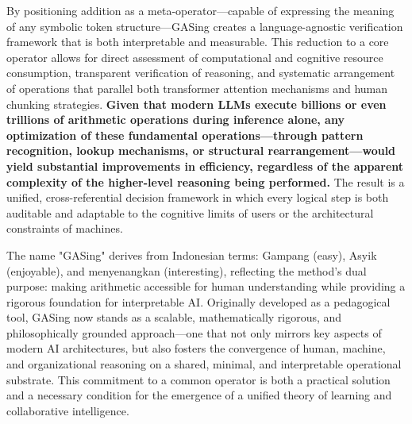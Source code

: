 By positioning addition as a meta-operator—capable of expressing the meaning of any symbolic token structure—GASing creates a language-agnostic verification framework that is both interpretable and measurable. This reduction to a core operator allows for direct assessment of computational and cognitive resource consumption, transparent verification of reasoning, and systematic arrangement of operations that parallel both transformer attention mechanisms and human chunking strategies. \textbf{Given that modern LLMs execute billions or even trillions of arithmetic operations during inference alone, any optimization of these fundamental operations—through pattern recognition, lookup mechanisms, or structural rearrangement—would yield substantial improvements in efficiency, regardless of the apparent complexity of the higher-level reasoning being performed.} The result is a unified, cross-referential decision framework in which every logical step is both auditable and adaptable to the cognitive limits of users or the architectural constraints of machines.

The name "GASing" derives from Indonesian terms: Gampang (easy), Asyik (enjoyable), and menyenangkan (interesting), reflecting the method’s dual purpose: making arithmetic accessible for human understanding while providing a rigorous foundation for interpretable AI. Originally developed as a pedagogical tool, GASing now stands as a scalable, mathematically rigorous, and philosophically grounded approach—one that not only mirrors key aspects of modern AI architectures, but also fosters the convergence of human, machine, and organizational reasoning on a shared, minimal, and interpretable operational substrate. This commitment to a common operator is both a practical solution and a necessary condition for the emergence of a unified theory of learning and collaborative intelligence.

